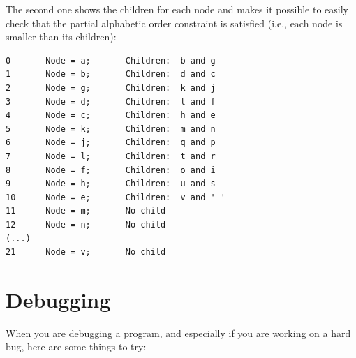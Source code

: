 The second one shows the children for each node and makes it 
possible to easily check that the partial alphabetic order 
constraint is satisfied (i.e., each node is smaller than its 
children):

\begin{verbatim}
0       Node = a;       Children:  b and g
1       Node = b;       Children:  d and c
2       Node = g;       Children:  k and j
3       Node = d;       Children:  l and f
4       Node = c;       Children:  h and e
5       Node = k;       Children:  m and n
6       Node = j;       Children:  q and p
7       Node = l;       Children:  t and r
8       Node = f;       Children:  o and i
9       Node = h;       Children:  u and s
10      Node = e;       Children:  v and ' '
11      Node = m;       No child
12      Node = n;       No child
(...)
21      Node = v;       No child
\end{verbatim}



\section{Debugging}

When you are debugging a program, and especially if you are
working on a hard bug, here are some things to try:

